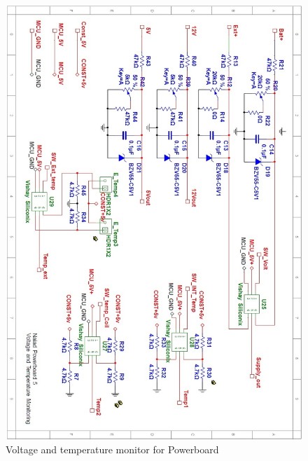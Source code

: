 \begin{figure}[!ht]
	\begin{center}
		\includegraphics[width=13.2cm]{./Images/Powerboard_Scematics/monitor.jpg}
		\caption{Voltage and temperature monitor for Powerboard}
	\end{center}
\end{figure}

